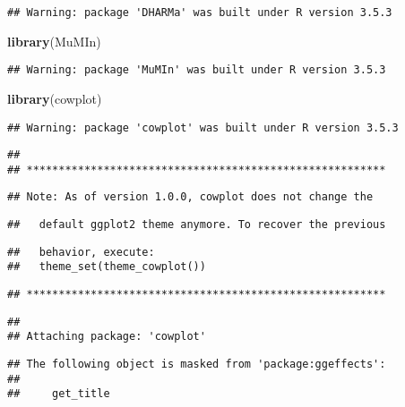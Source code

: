 \documentclass[]{article}
\newenvironment{Shaded}{\begin{snugshade}}{\end{snugshade}}
\newcommand{\KeywordTok}[1]{\textcolor[rgb]{0.13,0.29,0.53}{\textbf{#1}}}
\newcommand{\NormalTok}[1]{#1}
\begin{document}
\begin{verbatim}
## Warning: package 'DHARMa' was built under R version 3.5.3
\end{verbatim}

\begin{Shaded}
\begin{Highlighting}[]
\KeywordTok{library}\NormalTok{(MuMIn)}
\end{Highlighting}
\end{Shaded}

\begin{verbatim}
## Warning: package 'MuMIn' was built under R version 3.5.3
\end{verbatim}

\begin{Shaded}
\begin{Highlighting}[]
\KeywordTok{library}\NormalTok{(cowplot)}
\end{Highlighting}
\end{Shaded}

\begin{verbatim}
## Warning: package 'cowplot' was built under R version 3.5.3
\end{verbatim}

\begin{verbatim}
## 
## ********************************************************
\end{verbatim}

\begin{verbatim}
## Note: As of version 1.0.0, cowplot does not change the
\end{verbatim}

\begin{verbatim}
##   default ggplot2 theme anymore. To recover the previous
\end{verbatim}

\begin{verbatim}
##   behavior, execute:
##   theme_set(theme_cowplot())
\end{verbatim}

\begin{verbatim}
## ********************************************************
\end{verbatim}

\begin{verbatim}
## 
## Attaching package: 'cowplot'
\end{verbatim}

\begin{verbatim}
## The following object is masked from 'package:ggeffects':
## 
##     get_title
\end{verbatim}
\end{document}
